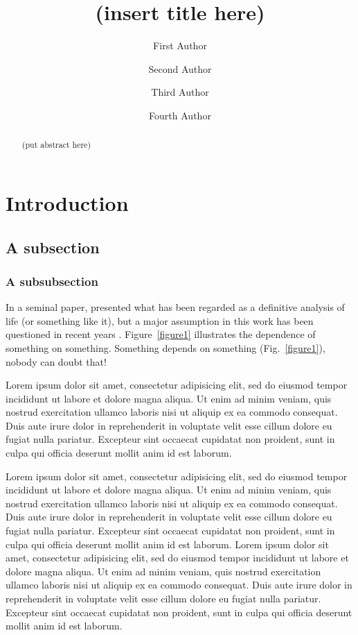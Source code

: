\documentclass[12pt,titlepage,figuresatend]{article}
\title{(insert title here)}
\author[1]{First Author}
\author[1]{Second Author}
\author[1]{Third Author}
\author[2]{Fourth Author}
\affil[1]{Address of first author,\authorcr in two lines}
\affil[2]{Address of second author in one lines}
\date{}
\begin{document}
\maketitle

\begin{abstract}
(put abstract here)
\end{abstract}

\listoffigures

\section{Introduction}

\subsection{A subsection}
\subsubsection{A subsubsection}

In a seminal paper, \cite{Pants+Friend:1908} presented what has been
regarded as a definitive analysis of life (or something like it), but
a major assumption in this work has been questioned in recent years
\cite[]{Smarter:2008}. Figure~\ref{figure1} illustrates the dependence
of something on something.  Something depends on something
(Fig.~\ref{figure1}), nobody can doubt that!

Lorem ipsum dolor sit amet, consectetur adipisicing elit, sed do
eiusmod tempor incididunt ut labore et dolore magna aliqua. Ut enim ad
minim veniam, quis nostrud exercitation ullamco laboris nisi ut
aliquip ex ea commodo consequat. Duis aute irure dolor in
reprehenderit in voluptate velit esse cillum dolore eu fugiat nulla
pariatur.  Excepteur sint occaecat cupidatat non proident, sunt in
culpa qui officia deserunt mollit anim id est laborum.


Lorem ipsum dolor sit amet, consectetur adipisicing elit, sed do eiusmod tempor
incididunt ut labore et dolore magna aliqua. Ut enim ad minim veniam, quis nostrud
exercitation ullamco laboris nisi ut aliquip ex ea commodo consequat. Duis aute irure
dolor in reprehenderit in voluptate velit esse cillum dolore eu fugiat nulla pariatur.
Excepteur sint occaecat cupidatat non proident, sunt in culpa qui officia deserunt
mollit anim id est laborum. Lorem ipsum dolor sit amet, consectetur adipisicing elit,
sed do eiusmod tempor incididunt ut labore et dolore magna aliqua. Ut enim ad minim
veniam, quis nostrud exercitation ullamco laboris nisi ut aliquip ex ea commodo
consequat. Duis aute irure dolor in reprehenderit in voluptate velit esse cillum
dolore eu fugiat nulla pariatur. Excepteur sint occaecat cupidatat non proident, sunt
in culpa qui officia deserunt mollit anim id est laborum.
\end{document}
